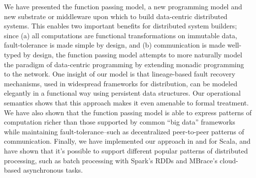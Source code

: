 \documentclass[10pt]{sigplanconf}
\theoremstyle{definition}
\theoremstyle{definition}
\begin{document}
We have presented the function passing model, a new programming model and new
substrate or middleware upon which to build data-centric distributed systems.
This enables two important benefits for distributed system builders; since (a)
all computations are functional transformations on immutable data,
fault-tolerance is made simple by design, and (b) communication is made
well-typed by design, the function passing model attempts to more naturally
model the paradigm of data-centric programming by extending monadic programming
to the network. One insight of our model is that lineage-based fault recovery
mechanisms, used in widespread frameworks for distribution, can be modeled
elegantly in a functional way using persistent data structures. Our operational
semantics shows that this approach makes it even amenable to formal treatment.
We have also shown that the function passing model is able to express patterns
of computation richer than those supported by common ``big data'' frameworks
while maintaining fault-tolerance--such as decentralized peer-to-peer patterns
of communication. Finally, we have implemented our approach in and for Scala,
and have shown that it's possible to support different popular patterns of
distributed processing, such as  batch processing with Spark's RDDs  and
MBrace's cloud-based asynchronous tasks.

%
%
%
%
%
%
\end{document}
